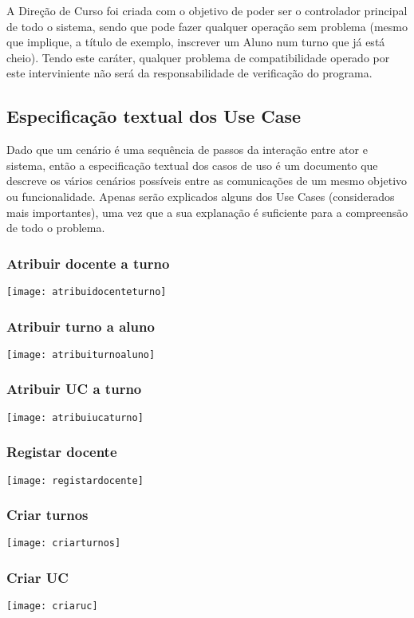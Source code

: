 \documentclass[a4paper]{article}
\begin{document}
A Direção de Curso foi criada com o objetivo de poder ser o controlador principal de todo o sistema, sendo que pode fazer qualquer operação sem problema (mesmo que implique, a título de exemplo, inscrever um Aluno num turno que já está cheio). Tendo este caráter, qualquer problema de compatibilidade operado por este interviniente não será da responsabilidade de verificação do programa.

\subsection{Especificação textual dos Use Case}
Dado que um cenário é uma sequência de passos da interação entre ator e sistema, então a especificação textual dos casos de uso é um documento que descreve os vários cenários possíveis entre as comunicações de um mesmo objetivo ou funcionalidade. Apenas serão explicados alguns dos Use Cases (considerados mais importantes), uma vez que a sua explanação é suficiente para a compreensão de todo o problema.

\subsubsection{Atribuir docente a turno}

\texttt{[image: atribuidocenteturno]}\break

\subsubsection{Atribuir turno a aluno}
\texttt{[image: atribuiturnoaluno]}\break

\subsubsection{Atribuir UC a turno}
\texttt{[image: atribuiucaturno]}\break

\subsubsection{Registar docente}
\texttt{[image: registardocente]}\break

\subsubsection{Criar turnos}
\texttt{[image: criarturnos]}\break

\subsubsection{Criar UC}
\texttt{[image: criaruc]}\break
\end{document}
